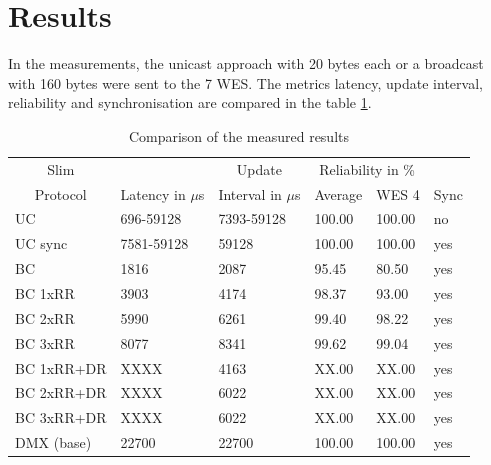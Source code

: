 

\section{Results}

In the measurements, the unicast approach with 20 bytes each or a broadcast with 160 bytes were sent to the 7 WES.
The metrics latency, update interval, reliability and synchronisation are compared in the table \cref{tab:results}.

\begin{table}[h]
	\centering
	\begin{tabular} { llllll }
	\toprule
	\multicolumn{1}{c}{Slim}
	& \multicolumn{1}{c}{}
	& \multicolumn{1}{c}{Update}
	& \multicolumn{2}{c}{Reliability in \%} 
	& \multicolumn{1}{c}{} \\

	\multicolumn{1}{c}{Protocol}
	& \multicolumn{1}{c}{Latency in $\mu$s}
	& \multicolumn{1}{c}{Interval in $\mu$s}
	& \multicolumn{1}{c}{Average}
	& \multicolumn{1}{c}{WES 4}
	& \multicolumn{1}{c}{Sync} \\

	\midrule
	UC        & 696-59128 &7393-59128 & 100.00 & 100.00 & no \\
	UC sync   &7581-59128 &59128      & 100.00 & 100.00 & yes \\
	BC        & 1816      & 2087      & 95.45  & 80.50  & yes \\
	BC 1xRR   & 3903      & 4174      & 98.37  & 93.00  & yes \\
	BC 2xRR   & 5990      & 6261      & 99.40  & 98.22  & yes \\
	BC 3xRR   & 8077      & 8341      & 99.62  & 99.04  & yes \\
	BC 1xRR+DR& XXXX      & 4163      & XX.00  & XX.00  & yes \\
	BC 2xRR+DR& XXXX      & 6022      & XX.00  & XX.00  & yes \\
	BC 3xRR+DR& XXXX      & 6022      & XX.00  & XX.00  & yes \\
	DMX (base)& 22700     & 22700     & 100.00 & 100.00 & yes \\
	\bottomrule
	\end{tabular}
	\caption{Comparison of the measured results}
	\label{tab:results}
\end{table}

